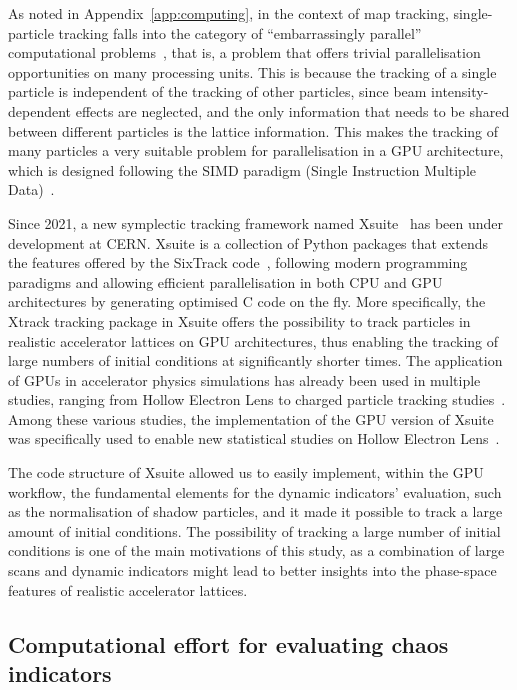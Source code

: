 As noted in Appendix~\ref{app:computing}, in the context of map tracking, single-particle tracking falls into the category of ``embarrassingly parallel'' computational problems~\cite{Giovannozzi:317866}, that is, a problem that offers trivial parallelisation opportunities on many processing units. This is because the tracking of a single particle is independent of the tracking of other particles, since beam intensity-dependent effects are neglected, and the only information that needs to be shared between different particles is the lattice information. This makes the tracking of many particles a very suitable problem for parallelisation in a GPU architecture, which is designed following the SIMD paradigm (Single Instruction Multiple Data)~\cite{DBLP:journals/corr/abs-1202-4347}.

Since 2021, a new symplectic tracking framework named Xsuite~\cite{xsuite} has been under development at CERN. Xsuite is a collection of Python packages that extends the features offered by the SixTrack code~\cite{De_Maria_2019}, following modern programming paradigms and allowing efficient parallelisation in both CPU and GPU architectures by generating optimised C code on the fly. More specifically, the Xtrack tracking package in Xsuite offers the possibility to track particles in realistic accelerator lattices on GPU architectures, thus enabling the tracking of large numbers of initial conditions at significantly shorter times. The application of GPUs in accelerator physics simulations has already been used in multiple studies, ranging from Hollow Electron Lens to charged particle tracking studies~\cite{pang2014gpu,oeftiger:hb16-mopr025,adelmann2019opal,schwinzerl:ipac21-thpab190,hermes:ipac2022-mopost045,iliakis2022enabling}. Among these various studies, the implementation of the GPU version of Xsuite was specifically used to enable new statistical studies on Hollow Electron Lens~\cite{hermes:ipac2022-mopost045}.

The code structure of Xsuite allowed us to easily implement, within the GPU workflow, the fundamental elements for the dynamic indicators' evaluation, such as the normalisation of shadow particles, and it made it possible to track a large amount of initial conditions. The possibility of tracking a large number of initial conditions is one of the main motivations of this study, as a combination of large scans and dynamic indicators might lead to better insights into the phase-space features of realistic accelerator lattices.
%
\subsection{Computational effort for evaluating chaos indicators}

